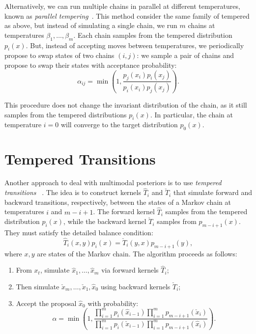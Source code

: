 \documentclass[11pt]{article}
\begin{document}
Alternatively, we can run multiple chains in parallel at different temperatures, known as
\emph{parallel tempering}~\citep{earl2005parallel}. This method consider the same family of tempered
as above, but instead of simulating a single chain, we run $m$ chains at temperatures 
$\beta_1, \ldots, \beta_m$. Each chain samples from the tempered distribution $p_i(x)$. But, instead of
accepting moves between temperatures, we periodically propose to swap states of two chains $(i, j)$: we
sample a pair of chains and propose to swap their states with acceptance probability:
\[
    \alpha_{ij} = \min\left(1, \frac{p_j(x_i) p_i(x_j)}{p_i(x_i) p_j(x_j)}\right).
\]

This procedure does not change the invariant distribution of the chain, as it still samples from
the tempered distributions $p_i(x)$. In particular, the chain at temperature $i= 0$ will converge to
the target distribution $p_0(x)$.

\section{Tempered Transitions}

Another approach to deal with multimodal posteriors is to use \emph{tempered transitions}~
\citep{neal1996sampling}. The idea is to construct kernels $\hat{T}_i$ and $\check{T}_i$ that
simulate forward and backward transitions, respectively, between the states of a Markov chain at
temperatures $i$ and $m-i+1$. The forward kernel $\hat{T}_i$ samples from the tempered distribution
$p_i(x)$, while the backward kernel $\check{T}_i$ samples from $p_{m-i+1}(x)$. They must satisfy the
detailed balance condition:
\[
    \hat{T}_i(x, y) p_i(x) = \check{T}_i(y, x) p_{m-i+1}(y),
\]
where $x, y$ are states of the Markov chain. The algorithm proceeds as follows:

\begin{enumerate}
    \item From $x_t$, simulate $\hat{x}_1, \ldots, \hat{x}_m$ via forward kernels 
    $\hat{T}_i$;
    \item Then simulate $\check{x}_m, \ldots, \check{x}_1, \hat{x}_0$ using 
    backward kernels $\check{T}_i$;
    \item Accept the proposal $\hat{x}_0$ with probability:
    \[
        \alpha = \min\left(1, \frac{\prod_{i=1}^{m} p_i(\hat{x}_{i-1}) \prod_{i=1}^{m} 
        p_{m-i+1}(\check{x}_i)}{\prod_{i=1}^{m} p_i(\check{x}_{i-1}) \prod_{i=1}^{m} 
        p_{m-i+1}(\hat{x}_i)} \right).
    \]
\end{enumerate}
\end{document}
